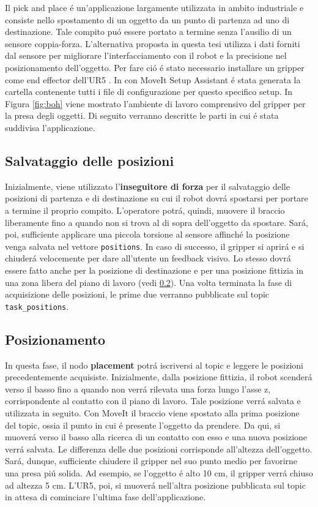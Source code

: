 Il pick and place \'{e} un'applicazione largamente utilizzata in ambito industriale e consiste nello spostamento di un oggetto 
da un punto di partenza ad uno di destinazione. Tale compito pu\'{o} essere portato a termine senza l'ausilio di un sensore 
coppia-forza. L'alternativa proposta in questa tesi utilizza i dati forniti dal sensore per migliorare l'interfacciamento con il robot 
e la precisione nel posizionamento dell'oggetto. Per fare ci\'{o} \'{e} stato necessario installare un gripper come end effector 
dell'UR5 \cite{gripper_repo}. In \cite{environment_setup} con MoveIt Setup Assistant \'{e} stata generata la cartella contenente 
tutti i file di configurazione per questo specifico setup. 
In Figura \ref{fig:boh} viene mostrato l'ambiente di lavoro comprensivo del gripper per la presa degli oggetti. 
Di seguito verranno descritte le parti in cui \'{e} stata suddivisa l'applicazione.
\subsection{Salvataggio delle posizioni} \label{sub:positions}
Inizialmente, viene utilizzato l'\textbf{inseguitore di forza} per il salvataggio delle posizioni di partenza e di destinazione 
su cui il robot dovr\'{a} spostarsi per portare a termine il proprio compito. 
L'operatore potr\'{a}, quindi, muovere il braccio liberamente fino a quando non si trova al di sopra dell'oggetto da spostare. 
Sar\'{a}, poi, sufficiente applicare una piccola torsione al sensore affinch\'{e} la posizione venga salvata nel vettore 
\verb|positions|. In caso di successo, il gripper si aprir\'{a} e si chiuder\'{a} velocemente per dare all'utente un feedback visivo. 
Lo stesso dovr\'{a} essere fatto anche per la posizione di destinazione e per una posizione fittizia in una zona libera 
del piano di lavoro (vedi \ref{sub:placement}). Una volta terminata la fase di acquisizione delle posizioni, 
le prime due verranno pubblicate sul topic \verb|task_positions|.
\subsection{Posizionamento} \label{sub:placement}
In questa fase, il nodo \textbf{placement} \cite{placement} potr\'{a} iscriversi al topic e leggere le posizioni precedentemente 
acquisiste. Inizialmente, dalla posizione fittizia, il robot scender\'{a} verso il basso fino a quando non verr\'{a} rilevata 
una forza lungo l'asse z, corrispondente al contatto con il piano di lavoro. Tale posizione verr\'{a} salvata e utilizzata in seguito. 
Con MoveIt il braccio viene spostato alla prima posizione del topic, ossia il punto in cui \'{e} presente l'oggetto da prendere.
Da qui, si muover\'{a} verso il basso alla ricerca di un contatto con esso e una nuova posizione verr\'{a} salvata. 
Le differenza delle due posizioni corrisponde all'altezza dell'oggetto. Sar\'{a}, dunque, sufficiente chiudere il gripper 
nel suo punto medio per favorirne una presa pi\'{u} solida. Ad esempio, se l'oggetto \'{e} alto 10 cm, il gripper verr\'{a} chiuso 
ad altezza 5 cm. 
L'UR5, poi, si muover\'{a} nell'altra posizione pubblicata sul topic in attesa di cominciare l'ultima fase dell'applicazione.
